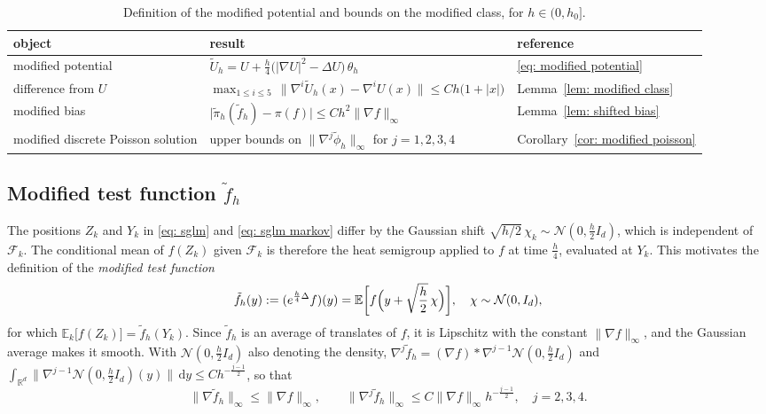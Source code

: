 \documentclass{article}
\newcommand{\Le}{\leqslant}
\newcommand{\D}{\mathrm{d}}
\newcommand{\norm}[1]{\lVert #1 \rVert}
\numberwithin{equation}{section}
\begin{document}
\begin{table}[htbp]
\centering
\begin{tabular}{lll}
\toprule
object & result & reference \\
\midrule
modified potential & $\displaystyle \tilde U_h = U + \frac h4 \bigl( |\nabla U|^2 - \Delta U \bigr)\, \theta_h$ & \eqref{eq: modified potential} \\[1.5ex]
difference from $U$ & $\displaystyle \max_{1 \Le i \Le 5}\, \norm{\nabla^i \tilde U_h(x) - \nabla^i U(x)} \Le C h \bigl( 1 + |x| \bigr)$ & Lemma~\ref{lem: modified class} \\[2.5ex]
modified bias & $\displaystyle \bigl| \tilde\pi_h(\tilde f_h) - \pi(f) \bigr| \Le C h^2 \norm{\nabla f}_\infty$ & Lemma~\ref{lem: shifted bias} \\[1.5ex]
modified discrete Poisson solution & upper bounds on $\displaystyle \norm{\nabla^j \tilde\phi_h}_\infty$ for $j = 1, 2, 3, 4$ & Corollary~\ref{cor: modified poisson} \\[1.5ex]
\bottomrule
\end{tabular}
\caption{Definition of the modified potential and bounds on the modified class, for $h \in (0,h_0]$.}
\label{tab: modified class}
\end{table}

\subsection{Modified test function $\tilde f_h$}
\label{subsec: modified test function}

The positions $Z_k$ and $Y_k$ in \eqref{eq: sglm} and \eqref{eq: sglm markov} differ by the Gaussian shift $\sqrt{h/2}\, \chi_k \sim \mathcal N(0, \frac h2 I_d)$, which is independent of $\mathcal F_{k}$. The conditional mean of $f(Z_k)$ given $\mathcal F_{k}$ is therefore the heat semigroup applied to $f$ at time $\frac h4$, evaluated at $Y_k$. This motivates the definition of the \emph{modified test function}
\begin{equation}
	\tilde f_h(y) := (e^{\frac h4\Delta }f)(y) = 
	\mathbb E\biggl[ f\Bigl( y + \sqrt{\frac h2}\, \chi \Bigr) \biggr] , \quad \chi \sim \mathcal N(0, I_d) ,
	\label{eq: heat shift}
\end{equation}
for which $\mathbb E_k\bigl[ f(Z_k) \bigr] = \tilde f_h(Y_k)$. Since $\tilde f_h$ is an average of translates of $f$, it is Lipschitz with the constant $\norm{\nabla f}_\infty$, and the Gaussian average makes it smooth. With $\mathcal N(0, \frac h2 I_d)$ also denoting the density, $\nabla^j \tilde f_h = (\nabla f) * \nabla^{j-1} \mathcal N(0, \frac h2 I_d)$ and $\int_{\mathbb R^d} \bigl\| \nabla^{j-1} \mathcal N(0, \frac h2 I_d)(y) \bigr\|\, \D y \Le C h^{-\frac{j-1}{2}}$, so that
\begin{equation}
    \norm{\nabla \tilde f_h}_\infty \Le \norm{\nabla f}_\infty , \qquad
    \norm{\nabla^j \tilde f_h}_\infty \Le C \norm{\nabla f}_\infty h^{-\frac{j-1}{2}} , \quad j = 2, 3, 4 .
    \label{eq: heat derivatives}
\end{equation}
\end{document}
